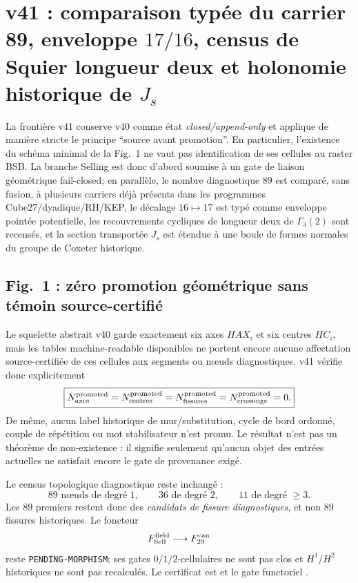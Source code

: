 \documentclass[11pt,a4paper]{article}
\newcommand{\certPending}{\texttt{PENDING-MORPHISM}}
\begin{document}
\section{v41 : comparaison typée du carrier 89, enveloppe $17/16$, census de Squier longueur deux et holonomie historique de $J_s$}\label{sec:v41-89-envelope-squier-J}

La frontière v41 conserve v40 comme état \emph{closed/append-only} et applique de manière stricte le principe ``source avant promotion''. En particulier, l'existence du schéma minimal de la Fig.~1 ne vaut pas identification de ses cellules au raster BSB. La branche Selling est donc d'abord soumise à un gate de liaison géométrique fail-closed; en parallèle, le nombre diagnostique $89$ est comparé, sans fusion, à plusieurs carriers déjà présents dans les programmes Cube27/dyadique/RH/KEP, le décalage $16\mapsto17$ est typé comme enveloppe pointée potentielle, les recouvrements cycliques de longueur deux de $\Gamma_3(2)$ sont recensés, et la section transportée $J_s$ est étendue à une boule de formes normales du groupe de Coxeter historique.

\subsection{Fig.~1 : zéro promotion géométrique sans témoin source-certifié}

Le squelette abstrait v40 garde exactement six axes $HAX_i$ et six centres $HC_i$, mais les tables machine-readable disponibles ne portent encore aucune affectation source-certifiée de ces cellules aux segments ou nœuds diagnostiques. v41 vérifie donc explicitement
\[
 \boxed{
 N_{\rm axes}^{\rm promoted}
 =N_{\rm centres}^{\rm promoted}
 =N_{\rm fissures}^{\rm promoted}
 =N_{\rm crossings}^{\rm promoted}=0.}
\]
De même, aucun label historique de mur/substitution, cycle de bord ordonné, couple de répétition ou mot stabilisateur n'est promu. Le résultat n'est pas un théorème de non-existence : il signifie seulement qu'aucun objet des entrées actuelles ne satisfait encore le gate de provenance exigé.

Le census topologique diagnostique reste inchangé :
\[
 \boxed{89\text{ nœuds de degré }1,
 \qquad36\text{ de degré }2,
 \qquad11\text{ de degré }\ge3.}
\]
Les $89$ premiers restent donc des \emph{candidats de fissure diagnostiques}, et non $89$ fissures historiques. Le foncteur
\[
 F_{\rm Sell}^{\rm field}\longrightarrow F_{29}^{\rm can}
\]
reste \certPending; ses gates $0/1/2$-cellulaires ne sont pas clos et $H^1/H^2$ historiques ne sont pas recalculés. Le certificat est  et le gate functoriel .
\end{document}
